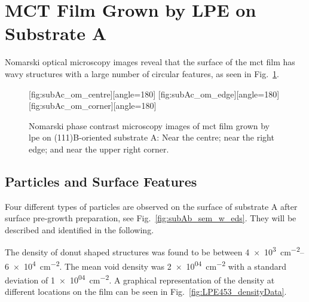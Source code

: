 \clearpage
\section{MCT Film Grown by LPE on Substrate A}\label{sec:subAc}

Nomarski optical microscopy images reveal that the surface of the \ac{mct} film has wavy structures with a large number of circular features, as seen in Fig.~\ref{fig:subAc_om}. 

\begin{figure}[htbp]
    \centering
    [fig:subAc_om_centre][angle=180]
    \hfill
    [fig:subAc_om_edge][angle=180]
    \hfill
    [fig:subAc_om_corner][angle=180]
    \caption[Nomarski phase contrast microscopy images of \ac{mct} film grown by \ac{lpe} on substrate A.]{Nomarski phase contrast microscopy images of \ac{mct} film grown by \ac{lpe} on (111)B-oriented substrate A:  Near the centre;  near the right edge; and  near the upper right corner.}
    \label{fig:subAc_om}
\end{figure}

\subsection{Particles and Surface Features}
Four different types of particles are observed on the surface of substrate A after surface pre-growth preparation, see Fig.~\ref{fig:subAb_sem_w_eds}. They will be described and identified in the following.


The density of donut shaped structures was found to be between \SIrange{4e+3}{6e+4}{\centi\metre^{-2}}. The mean void density was \SI{2e+04}{\centi\metre^{-2}} with a standard deviation of \SI{1e+04}{\centi\metre^{-2}}. A graphical representation of the density at different locations on the film can be seen in Fig.~\ref{fig:LPE453_densityData}.

